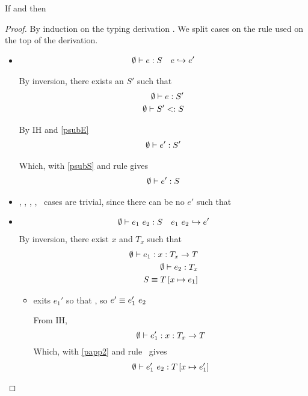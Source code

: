 \begin{theorem}[Preservation]
	If  and  then 
\end{theorem}
	
\begin{proof}
By induction on the typing derivation .
We split cases on the rule used on the top of the derivation.

\begin{itemize}
\item\tsub 
\begin{align*}
{\emptyset}\vdash {e}:{S} && {e}\hookrightarrow {e'}
\end{align*}

By inversion, there exists an $S'$ such that 
\begin{align}
{\emptyset}\vdash {e}:{S'} 	\label{psubE}\\
{\emptyset}\vdash {S'}<:{S}		\label{psubS}
\end{align}

By IH and \ref{psubE}
\begin{align}
{\emptyset}\vdash {e'}:{S'}
\end{align}

Which, with \ref{psubS} and rule  gives
\begin{align}
{\emptyset}\vdash {e'}:{S}
\end{align}

\item	{}, 
		, 
		\tcon, 
		,
		\tgen\
cases are trivial, since there can be no $e'$ such that 	

\item {}
\begin{align*}
{\emptyset}\vdash {\ensuremath{{e_1} \ {e_2}}}:{S} && {{e_1} \ {e_2}}\hookrightarrow {e'} 
\end{align*}
By inversion, there exist $x$ and $T_x$ such that 
\begin{align}
{\emptyset}\vdash {e_1}:{x : T_x \rightarrow T} 		\label{papp1}\\
{\emptyset}\vdash {e_2}:{T_x}					\label{papp2}\\
S \equiv T\left[ x \mapsto e_1 \right]					\label{pappS}
\end{align}

\begin{itemize}
	\item exits $e_1'$ so that , so $e' \equiv {e_1'} \ {e_2}$

From IH, $$ {\emptyset}\vdash {e_1'}:{x : T_x \rightarrow T}$$
Which, with \ref{papp2} and rule \tapp\ gives 
\begin{align}
{\emptyset}\vdash {\ensuremath{{e_1'} \ {e_2}}}:{T\left[ x \mapsto e_1' \right]} \label{prese1}
\end{align}


\end{itemize}
\end{itemize}
\end{proof}
